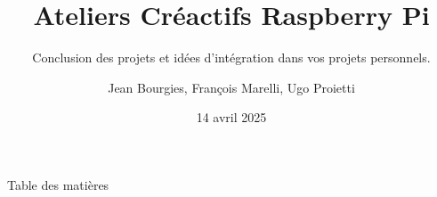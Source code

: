 \documentclass[aspectratio=169,xcolor=dvipsnames]{beamer}
\title{Ateliers Créactifs Raspberry Pi}
\subtitle{Conclusion des projets et idées d'intégration dans vos projets personnels.}
\author{Jean Bourgies, François Marelli, Ugo Proietti}
\date{14 avril 2025}
\begin{document}
\begin{frame}
    \titlepage
\end{frame}

\begin{frame}{Table des matières}
    \tableofcontents
\end{frame}
\end{document}
